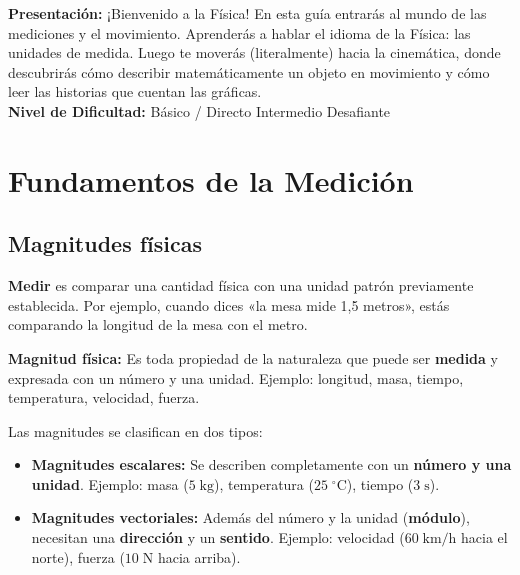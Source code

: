 \documentclass[12pt, a4paper]{article}
\begin{document}


\vspace{4pt}
\begin{cuadroinfo}
\small
\textbf{Presentación:} ¡Bienvenido a la Física! En esta guía entrarás al mundo de las mediciones y el movimiento. Aprenderás a hablar el idioma de la Física: las unidades de medida. Luego te moverás (literalmente) hacia la cinemática, donde descubrirás cómo describir matemáticamente un objeto en movimiento y cómo leer las historias que cuentan las gráficas.
\\[4pt]
\textbf{Nivel de Dificultad:}\quad
\facil{} Básico / Directo \quad
\medio{} Intermedio \quad
\dificil{} Desafiante
\end{cuadroinfo}

\vspace{8pt}

\section{Fundamentos de la Medición}

\subsection{Magnitudes físicas}

\textbf{Medir} es comparar una cantidad física con una unidad patrón previamente establecida. Por ejemplo, cuando dices «la mesa mide 1,5 metros», estás comparando la longitud de la mesa con el metro.

\begin{cuadroteoria}
\textbf{Magnitud física:} Es toda propiedad de la naturaleza que puede ser \textbf{medida} y expresada con un número y una unidad. Ejemplo: longitud, masa, tiempo, temperatura, velocidad, fuerza.
\end{cuadroteoria}

Las magnitudes se clasifican en dos tipos:

\begin{cuadrosolucion}
\begin{itemize}[leftmargin=*]
  \item \textbf{Magnitudes escalares:} Se describen completamente con un \textbf{número y una unidad}. Ejemplo: masa ($5\;\text{kg}$), temperatura ($25\;^\circ\text{C}$), tiempo ($3\;\text{s}$).

  \item \textbf{Magnitudes vectoriales:} Además del número y la unidad (\textbf{módulo}), necesitan una \textbf{dirección} y un \textbf{sentido}. Ejemplo: velocidad ($60\;\text{km/h}$ hacia el norte), fuerza ($10\;\text{N}$ hacia arriba).
\end{itemize}
\end{cuadrosolucion}
\end{document}
